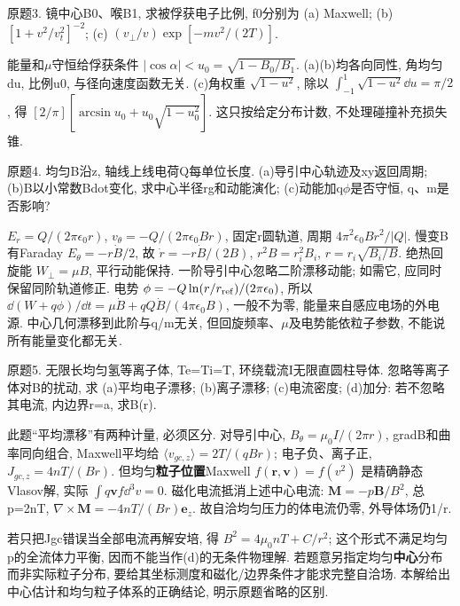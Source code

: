 \begin{exercise}\label{ex:03-3-3}
原题3. 镜中心B0、喉B1, 求被俘获电子比例, f0分别为 (a) Maxwell; (b) $[1+v^2/v_t^2]^{-2}$; (c) $(v_\perp/v)\exp[-mv^2/(2T)]$.
\end{exercise}
\begin{solution}
能量和\ensuremath{\mu}守恒给俘获条件 $|\cos\alpha|<u_0=\sqrt{1-B_0/B_1}$. (a)(b)均各向同性, 角均匀du, 比例u0, 与径向速度函数无关. (c)角权重 $\sqrt{1-u^2}$, 除以 $\int_{-1}^1\sqrt{1-u^2}\dd u=\pi/2$, 得 $[2/\pi][\arcsin u_0+u_0\sqrt{1-u_0^2}]$. 这只按给定分布计数, 不处理碰撞补充损失锥.
\end{solution}
\begin{exercise}\label{ex:03-3-4}
原题4. 均匀B沿z, 轴线上线电荷Q每单位长度. (a)导引中心轨迹及xy返回周期; (b)B以小常数Bdot变化, 求中心半径rg和动能演化; (c)动能加q\ensuremath{\phi}是否守恒, q、m是否影响?
\end{exercise}
\begin{solution}
$E_r=Q/(2\pi\epsilon_0r)$, $v_\theta=-Q/(2\pi\epsilon_0Br)$, 固定r圆轨道, 周期 $4\pi^2\epsilon_0Br^2/|Q|$. 慢变B有Faraday $E_\theta=-r\dot B/2$, 故 $\dot r=-r\dot B/(2B)$, $r^2B=r_i^2B_i$, $r=r_i\sqrt{B_i/B}$. 绝热回旋能 $W_\perp=\mu B$, 平行动能保持. 一阶导引中心忽略二阶漂移动能; 如需它, 应同时保留同阶轨道修正. 电势 $\phi=-Q\ln(r/r_{\rm ref})/(2\pi\epsilon_0)$, 所以
$\dd(W+q\phi)/\dd t=\mu\dot B+qQ\dot B/(4\pi\epsilon_0B)$, 一般不为零, 能量来自感应电场的外电源. 中心几何漂移到此阶与q/m无关, 但回旋频率、\ensuremath{\mu}及电势能依粒子参数, 不能说所有能量变化都无关.
\end{solution}
\begin{exercise}\label{ex:03-3-5}
原题5. 无限长均匀氢等离子体, Te=Ti=T, 环绕载流I无限直圆柱导体. 忽略等离子体对B的扰动, 求 (a)平均电子漂移; (b)离子漂移; (c)电流密度; (d)加分: 若不忽略其电流, 内边界r=a, 求B(r).
\end{exercise}
\begin{solution}
此题``平均漂移''有两种计量, 必须区分. 对导引中心, $B_\theta=\mu_0I/(2\pi r)$, gradB和曲率同向组合, Maxwell平均给 $\langle v_{gc,z}\rangle=2T/(qBr)$; 电子负、离子正, $J_{gc,z}=4nT/(Br)$. 但均匀\textbf{粒子位置}Maxwell $f(\mathbf r,\mathbf v)=f(v^2)$ 是精确静态Vlasov解, 实际 $\int q\mathbf vf\dd^3v=0$. 磁化电流抵消上述中心电流: $\mathbf M=-p\mathbf B/B^2$, 总p=2nT, $\nabla\times\mathbf M=-4nT/(Br)\mathbf e_z$. 故自洽均匀压力的体电流仍零, 外导体场仍1/r.

若只把Jgc错误当全部电流再解安培, 得 $B^2=4\mu_0nT+C/r^2$; 这个形式不满足均匀p的全流体力平衡, 因而不能当作(d)的无条件物理解. 若题意另指定均匀\textbf{中心}分布而非实际粒子分布, 要给其坐标测度和磁化/边界条件才能求完整自洽场. 本解给出中心估计和均匀粒子体系的正确结论, 明示原题省略的区别.
\end{solution}
